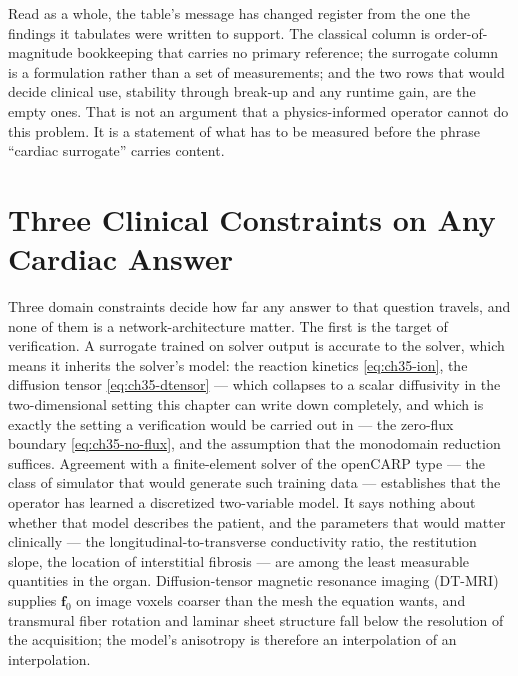 Read as a whole, the table's message has changed register from the one the
findings it tabulates were written to support. The classical column is order-of-magnitude bookkeeping that
carries no primary reference; the surrogate column is a formulation rather than a set of
measurements; and the two rows that would decide
clinical use, stability through break-up and any runtime gain, are the empty ones.
That is not an argument that a physics-informed operator cannot do this problem.
It is a statement of what has to be measured before the phrase ``cardiac
surrogate'' carries content.

\section{Three Clinical Constraints on Any Cardiac Answer}
\label{sec:ch35-clinical}

Three domain constraints decide how far any answer to that question travels, and
none of them is a network-architecture matter. The first is the target of
verification. A surrogate trained on solver output is accurate to the solver,
which means it inherits the solver's model: the reaction kinetics
\eqref{eq:ch35-ion}, the diffusion tensor \eqref{eq:ch35-dtensor} --- which
collapses to a scalar diffusivity in the two-dimensional setting this chapter can
write down completely, and which is exactly the setting a verification would be
carried out in --- the zero-flux boundary
\eqref{eq:ch35-no-flux}, and the assumption that the monodomain reduction
suffices. Agreement with a finite-element solver of the openCARP
type --- the class of simulator that would generate such training data --- establishes
that the operator has learned a discretized two-variable model. It
says nothing about whether that model
describes the patient, and the parameters that would matter clinically --- the
longitudinal-to-transverse conductivity ratio, the restitution slope, the
location of interstitial fibrosis --- are among the least measurable quantities in
the organ. Diffusion-tensor magnetic resonance imaging
(DT-MRI) supplies $\mathbf{f}_0$
on image voxels coarser than the mesh the equation wants, and
transmural fiber rotation and laminar sheet structure fall below the resolution
of the acquisition; the model's anisotropy is therefore an interpolation of an
interpolation.

